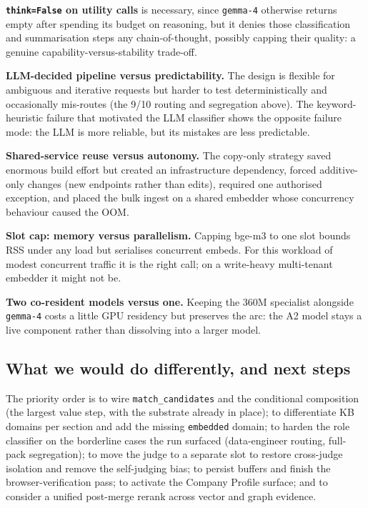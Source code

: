 \textbf{\texttt{think=False} on utility calls} is necessary, since \verb|gemma-4| otherwise
returns empty after spending its budget on reasoning, but it denies those classification
and summarisation steps any chain-of-thought, possibly capping their quality: a genuine
capability-versus-stability trade-off.

\textbf{LLM-decided pipeline versus predictability.} The design is flexible for ambiguous
and iterative requests but harder to test deterministically and occasionally mis-routes (the
9/10 routing and segregation above). The keyword-heuristic failure that motivated the LLM
classifier shows the opposite failure mode: the LLM is more reliable, but its mistakes are
less predictable.

\textbf{Shared-service reuse versus autonomy.} The copy-only strategy saved enormous build
effort but created an infrastructure dependency, forced additive-only changes (new endpoints
rather than edits), required one authorised exception, and placed the bulk ingest on a
shared embedder whose concurrency behaviour caused the OOM.

\textbf{Slot cap: memory versus parallelism.} Capping bge-m3 to one slot bounds RSS under
any load but serialises concurrent embeds. For this workload of modest concurrent traffic
it is the right call; on a write-heavy multi-tenant embedder it might not be.

\textbf{Two co-resident models versus one.} Keeping the 360M specialist alongside
\verb|gemma-4| costs a little GPU residency but preserves the arc: the A2 model stays a live
component rather than dissolving into a larger model.

\subsection{What we would do differently, and next steps}

The priority order is to wire \verb|match_candidates| and the conditional composition (the
largest value step, with the substrate already in place); to differentiate KB domains per
section and add the missing \texttt{embedded} domain; to harden the role classifier on the
borderline cases the run surfaced (data-engineer routing, full-pack segregation); to move the
judge to a separate slot to restore cross-judge isolation and remove the self-judging bias;
to persist buffers and finish the browser-verification pass; to activate the Company Profile
surface; and to consider a unified post-merge rerank across vector and graph evidence.
